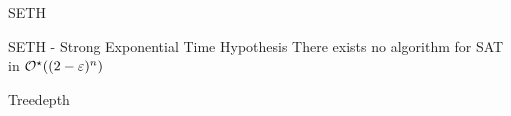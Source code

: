 \begin{frame}{SETH}
    \begin{alertblock}{SETH - Strong Exponential Time Hypothesis}
        There exists no algorithm for SAT in $\mathcal{O}^\star((2-\varepsilon)^n)$
    \end{alertblock}
\end{frame}

\begin{frame}{Treedepth}
    \centering
    
\end{frame}